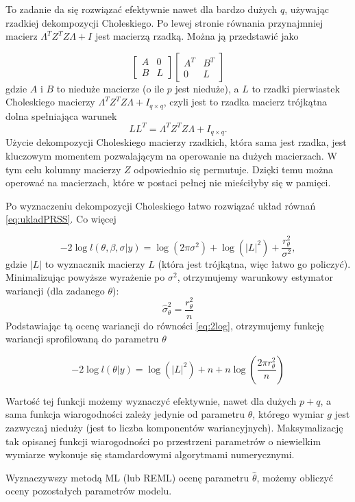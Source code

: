 \documentclass[12pt]{mwbk}
\theoremstyle{plain}
\theoremstyle{definition}
\theoremstyle{remark}
\begin{document}
To zadanie da się rozwiązać efektywnie nawet dla bardzo dużych $q$, używając rzadkiej dekompozycji Choleskiego. Po lewej stronie równania przynajmniej macierz $\Lambda^TZ^TZ\Lambda+I$ jest macierzą rzadką. Można ją przedstawić jako

$$\begin{bmatrix}
A & 0 \\
B & L
\end{bmatrix}
\begin{bmatrix}
A^T & B^T\\
0 & L
\end{bmatrix}
$$
gdzie $A$ i $B$ to nieduże macierze (o ile $p$ jest nieduże), a $L$ to rzadki pierwiastek Choleskiego macierzy $\Lambda^TZ^TZ\Lambda+I_{q\times q}$, czyli jest to rzadka macierz trójkątna dolna spełniająca warunek $$LL^T=\Lambda^TZ^TZ\Lambda +I_{q \times q}.$$ Użycie dekompozycji Choleskiego macierzy rzadkich, która sama jest rzadka, jest kluczowym momentem pozwalającym na operowanie na dużych macierzach. W tym celu kolumny macierzy $Z$ odpowiednio się permutuje. Dzięki temu można operować na macierzach, które w postaci pełnej nie mieściłyby się w pamięci.

Po wyznaczeniu dekompozycji Choleskiego łatwo rozwiązać układ równań \ref{eq:ukladPRSS}. Co więcej

\begin{equation} \label{eq:2log}
-2\log l(\theta,\beta,\sigma|y)=\log(2\pi \sigma^2)+\log(|L|^2) +\frac{r^2_{\theta}}{\sigma^2}, 
\end{equation}
gdzie $|L|$ to wyznacznik macierzy $L$ (która jest trójkątna, więc łatwo go policzyć). Minimalizując powyższe wyrażenie po $\sigma^2$, otrzymujemy warunkowy estymator wariancji (dla zadanego $\theta$):
$$\hat{\sigma}_{\theta}^2=\frac{r^2_{\theta}}{n}$$
Podstawiając tą ocenę wariancji do równości \ref{eq:2log}, otrzymujemy funkcję wariancji sprofilowaną do parametru $\theta$

$$-2 \log l(\theta|y)=\log(|L|^2)+n+n\log\left(\frac{2\pi r^2_{\theta}}{n}\right)$$

Wartość tej funkcji możemy wyznaczyć efektywnie, nawet dla dużych $p+q$, a sama funkcja wiarogodności zależy jedynie od parametru $\theta$, którego wymiar $g$ jest zazwyczaj nieduży (jest to liczba komponentów wariancyjnych). Maksymalizację tak opisanej funkcji wiarogodności po przestrzeni parametrów o niewielkim wymiarze wykonuje się stamdardowymi algorytmami numerycznymi.

Wyznaczywszy metodą ML (lub REML) ocenę parametru $\hat{\theta}$, możemy obliczyć oceny pozostałych parametrów modelu. 
\end{document}
